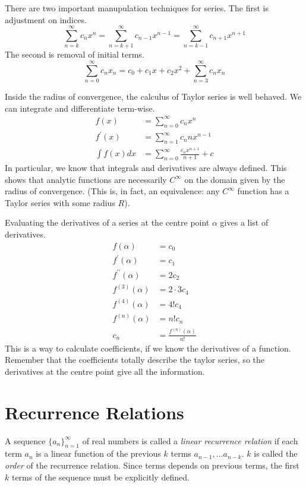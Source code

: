 \documentclass[fleqn,letterpaper]{report}
\begin{document}
There are two important manupulation techniques for series.
The first is adjustment on indices.
\begin{equation*}
\sum_{n=k}^\infty c_n x^n = \sum_{n=k+1}^\infty c_{n-1} x^{n-1}
= \sum_{n=k-1}^\infty c_{n+1} x^{n+1} 
\end{equation*}
The second is removal of initial terms.
\begin{equation*}
\sum_{n=0}^\infty c_n x_n = c_0 + c_1 x + c_2 x^2 +
\sum_{n=3}^\infty c_n x_n
\end{equation*}

Inside the radius of convergence, the calculus of Taylor
series is well behaved. We can integrate and
differentiate term-wise.
\begin{align*}
f(x) & = \sum_{n=0}^\infty c_n x^n \\
f^\prime(x) & = \sum_{n=1}^\infty c_n nx^{n-1} \\
\int f(x) dx & = \sum_{n=0}^\infty \frac{c_n x^{n+1}}{n+1} + c
\end{align*}
In particular, we know that integrals and derivatives are always
defined. This shows that analytic functions are necessarily 
$C^\infty$ on the domain given by the radius of convergence.
(This is, in fact, an equivalence: any $C^\infty$ function has
a Taylor series with some radius $R$).

Evaluating the derivatives of a series at the centre point
$\alpha$ gives a list of derivatives.
\begin{align*}
f(\alpha) & = c_0 \\
f^{\prime} (\alpha) & = c_1 \\
f^{\prime \prime} (\alpha) & = 2c_2 \\
f^{(3)} (\alpha) & = 2\cdot 3c_4 \\
f^{(4)} (\alpha) & = 4!c_4 \\
f^{(n)} (\alpha) & = n!c_n \\
c_n & = \frac{f^{(n)} (\alpha)}{n!} 
\end{align*}
This is a way to calculate coefficients, if we know the
derivatives of a function. Remember that the coefficients
totally describe the taylor series, so the derivatives at the
centre point give all the information.

\section{Recurrence Relations}
\label{recurrence-relations}

A sequence $\{a_n\}_{n=1}^\infty$ of real numbers is called a
\emph{linear recurrence relation} if each term $a_n$ is a
linear function of the previous $k$ terms $a_{n-1}, \ldots
a_{n-k}$. $k$ is called the \emph{order} of the recurrence
relation. Since terms depends on previous terms, the first
$k$ terms of the sequence must be explicitly defined.
\end{document}
